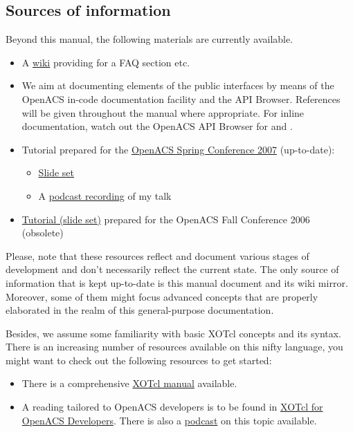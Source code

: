 \subsection{Sources of information}
Beyond this manual, the following materials are currently available.
\begin{itemize}
\item A \href{http://alice.wu-wien.ac.at:8000/xorb-doc}{wiki} providing for a FAQ section etc.
\item We aim at documenting elements of the public interfaces by means of the OpenACS in-code 
documentation facility and the API Browser. References will be given throughout the manual where 
appropriate. For inline documentation, watch out the OpenACS API Browser for  and .
\item Tutorial prepared for the \href{http://oacs-dotlrn-conf2007.wu-wien.ac.at/}{OpenACS Spring 
Conference 2007} (up-to-date):
\begin{itemize} 
\item \href{http://oacs-dotlrn-conf2007.wu-wien.ac.at/conf2007/file/sobernig-xosoap-slides.pdf?
m=download|Slide set}{Slide set}
\item A \href{http://oacs-dotlrn-conf2007.wu-wien.ac.at/conf2007/file/tutorial-sobernig.mp4?
m=download}{podcast recording} of my talk
\end{itemize}
\item \href{http://nm.wu-wien.ac.at/research/publications/b670.pdf}{Tutorial (slide set)} prepared for the 
OpenACS Fall Conference 2006 (obsolete) 
\end{itemize}
Please, note that these resources reflect and document various stages of development and don't 
necessarily reflect the current state. The only source of information that is kept up-to-date is this manual 
document and its wiki mirror. Moreover, some of them might focus advanced concepts that are properly 
elaborated in the realm of this general-purpose documentation.

Besides, we assume some familiarity with basic XOTcl concepts and its syntax. There is an increasing number of resources available on this nifty language, you might want to check out the following resources to get started:

\begin{itemize}
\item There is a comprehensive \href{http://media.wu-wien.ac.at/doc/tutorial.html}{XOTcl manual} available.
\item A reading tailored to OpenACS developers is to be found in \href{http://www.matuska.org/martin/doc/xotcl-openacs-2007.pdf}{XOTcl for OpenACS Developers}. There is also a \href{http://www.matuska.org/martin/doc/xotcl-openacs-2007-p.pdf}{podcast} on this topic available.
\end{itemize}
